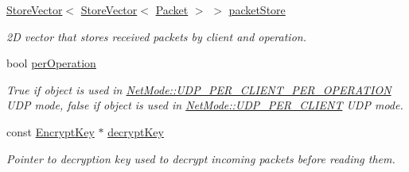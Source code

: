 \begin{DoxyCompactItemize}
\item 
\hypertarget{class_net_mode_udp_per_client_ae4ba9cc15c6cf4fe6bd00bd3396a8251}{
\hyperlink{class_store_vector}{StoreVector}$<$ \hyperlink{class_store_vector}{StoreVector}$<$ \hyperlink{class_packet}{Packet} $>$ $>$ \hyperlink{class_net_mode_udp_per_client_ae4ba9cc15c6cf4fe6bd00bd3396a8251}{packetStore}}
\label{class_net_mode_udp_per_client_ae4ba9cc15c6cf4fe6bd00bd3396a8251}

\begin{DoxyCompactList}\small\item\em 2D vector that stores received packets by client and operation. \item\end{DoxyCompactList}\item 
\hypertarget{class_net_mode_udp_per_client_a08a0bc34d06354add6d22f504ccfdaf7}{
bool \hyperlink{class_net_mode_udp_per_client_a08a0bc34d06354add6d22f504ccfdaf7}{perOperation}}
\label{class_net_mode_udp_per_client_a08a0bc34d06354add6d22f504ccfdaf7}

\begin{DoxyCompactList}\small\item\em True if object is used in \hyperlink{class_net_mode_a43cfa55ee6a4db66a8d7d6c27f766964a947fd0828716fc0442ea546cce111c27}{NetMode::UDP\_\-PER\_\-CLIENT\_\-PER\_\-OPERATION} UDP mode, false if object is used in \hyperlink{class_net_mode_a43cfa55ee6a4db66a8d7d6c27f766964abb3d396c14fdec8b8e5fd8a785dfba45}{NetMode::UDP\_\-PER\_\-CLIENT} UDP mode. \item\end{DoxyCompactList}\item 
\hypertarget{class_net_mode_udp_per_client_a6526b99fd75abe001e6e92e1e8bcd1e3}{
const \hyperlink{class_encrypt_key}{EncryptKey} $\ast$ \hyperlink{class_net_mode_udp_per_client_a6526b99fd75abe001e6e92e1e8bcd1e3}{decryptKey}}
\label{class_net_mode_udp_per_client_a6526b99fd75abe001e6e92e1e8bcd1e3}

\begin{DoxyCompactList}\small\item\em Pointer to decryption key used to decrypt incoming packets before reading them. \item\end{DoxyCompactList}\end{DoxyCompactItemize}


